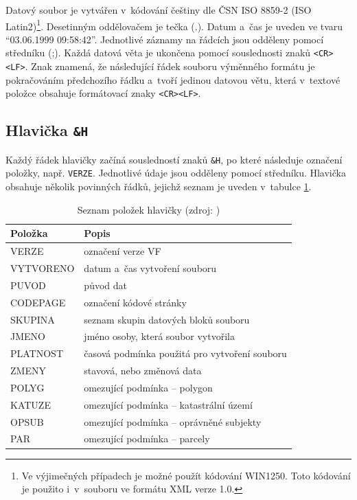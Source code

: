 \documentclass[a4paper,12pt,oneside]{book}
\begin{document}
Datový soubor je vytvářen v~kódování češtiny dle ČSN ISO 8859-2 (ISO
Latin2)\footnote{Ve výjimečných případech je možné použít kódování
  WIN1250. Toto kódování je použito i~v~souboru ve formátu XML verze
  1.0.}. Desetinným oddělovačem je tečka (.). Datum a~čas je uveden ve
tvaru ``03.06.1999 09:58:42''. Jednotlivé záznamy na řádcích jsou
odděleny pomocí středníku (;). Každá datová věta je ukončena pomocí
souslednosti znaků \texttt{<CR><LF>}. Znak \uv{\texttt{\currency}}
znamená, že následující řádek souboru výměnného formátu je
pokračováním předchozího řádku a~tvoří jedinou datovou větu, která
v~textové položce obsahuje formátovací znaky
\texttt{<CR><LF>}.

\subsection{Hlavička \texttt{\&H}}

Každý řádek hlavičky začíná sousledností znaků \texttt{\&H}, po které
následuje označení položky, např. \texttt{VERZE}. Jednotlivé údaje
jsou odděleny pomocí středníku. Hlavička obsahuje několik povinných
řádků, jejichž seznam je uveden v~tabulce \ref{t_hlavicka}.

\begin{table}[htbp]
\centering
\caption[Seznam položek hlavičky]{Seznam položek hlavičky (zdroj: \cite{vfk_struktura})}
\begin{tabular}{ll}
\toprule
\textbf{Položka} & \textbf{Popis} \\ 
\midrule
VERZE & označení verze VF \\ 
VYTVORENO & datum a~čas vytvoření souboru \\ 
PUVOD & původ dat \\ 
CODEPAGE & označení kódové stránky \\ 
SKUPINA & seznam skupin datových bloků souboru \\ 
JMENO & jméno osoby, která soubor vytvořila \\ 
PLATNOST & časová podmínka použitá pro vytvoření souboru \\ 
ZMENY & stavová, nebo změnová data \\ 
POLYG & omezující podmínka -- polygon \\
KATUZE & omezující podmínka -- katastrální území \\
OPSUB & omezující podmínka -- oprávněné subjekty \\
PAR & omezující podmínka -- parcely \\
\bottomrule
\end{tabular}
\label{t_hlavicka}
\end{table}
\end{document}
